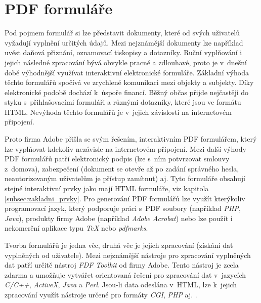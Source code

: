 \section{PDF formuláře}
Pod pojmem formulář si lze představit dokumenty, které od svých uživatelů vyžadují vyplnění určitých údajů. Mezi nejznámější dokumenty lze například uvést daňová přiznání, oznamovací tiskopisy a dotazníky. Ruční vyplňování i jejich následné zpracování bývá obvykle pracné a zdlouhavé, proto je v~dnešní době výhodnější využívat interaktivní elektronické formuláře. Základní výhoda těchto formulářů spočívá ve zrychlené komunikaci mezi objekty a subjekty. Díky elektronické podobě dochází k~úspoře financí. Běžný občas přijde nejčastěji do styku s~přihlašovacími formuláři a různými dotazníky, které jsou ve formátu HTML. Nevýhoda těchto formulářů je v~jejich závislosti na internetovém připojení. 
\par
Proto firma Adobe přišla se svým řešením, interaktivním PDF formulářem, který lze vyplňovat kdekoliv nezávisle na internetovém připojení. Mezi další výhody PDF formulářů patří elektronický podpis (lze s~ním potvrzovat smlouvy z~domova), zabezpečení (dokument se otevře až po zadání správného hesla, neautorizovaným uživatelům je přístup zamítnut) aj. Tyto formuláře obsahují stejné interaktivní prvky jako mají HTML formuláře, viz kapitola \ref{subsec:zakladni_prvky}. Pro generování PDF formulářů lze využít kterýkoliv programovací jazyk, který podporuje práci s~PDF soubory (například \textit{PHP}, \textit{Java}), produkty firmy Adobe (například \textit{Adobe Acrobat}) nebo lze použít i nekomerční aplikace typu \textit{TeX} nebo \textit{pdfmarks}.
\par
Tvorba formulářů je jedna věc, druhá věc je jejich zpracování (získání dat vyplněných od uživatele). Mezi nejznámější nástroje pro zpracování vyplněných dat patří určitě nástroj \textit{FDF Toolkit} od firmy Adobe. Tento nástroj je zcela zdarma a umožňuje vytvářet orientovaná řešení pro zpracování dat v~jazycích \textit{C/C++}, \textit{ActiveX}, \textit{Java} a \textit{Perl}. Jsou-li data odeslána v~HTML, lze k~jejich zpracování využít nástroje určené pro formáty \textit{CGI}, \textit{PHP} aj. \cite{PDFForm}.
